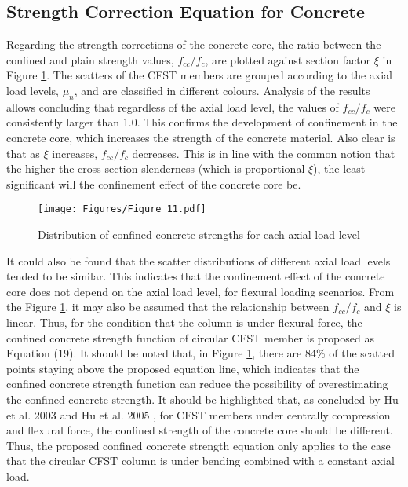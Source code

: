 \documentclass[12pt,a4]{article}
\begin{document}
	\subsection{Strength Correction Equation for Concrete}
	Regarding the strength corrections of the concrete core, the ratio between the confined and plain strength values, $f_{cc}/f_c$, are plotted against section factor $ξ$ in Figure \ref{fig-10}. The scatters of the CFST members are grouped according to the axial load levels, $μ_n$, and are classified in different colours. Analysis of the results allows concluding that regardless of the axial load level, the values of $f_{cc}/f_c$ were consistently larger than 1.0. This confirms the development of confinement in the concrete core, which increases the strength of the concrete material. Also clear is that as $ξ$ increases, $f_{cc}/f_c$ decreases. This is in line with the common notion that the higher the cross-section slenderness (which is proportional $ξ$), the least significant will the confinement effect of the concrete core be.
	\par
	\begin{figure}[h]
		\centering
		\texttt{[image: Figures/Figure\_11.pdf]}
		\caption{Distribution of confined concrete strengths for each axial load level}
		\label{fig-10}
	\end{figure}
	\par
	It could also be found that the scatter distributions of different axial load levels tended to be similar. This indicates that the confinement effect of the concrete core does not depend on the axial load level, for flexural loading scenarios. From the Figure \ref{fig-10}, it may also be assumed that the relationship between $f_{cc}/f_c$ and $ξ$ is linear. Thus, for the condition that the column is under flexural force, the confined concrete strength function of circular CFST member is proposed as Equation (19). It should be noted that, in Figure \ref{fig-10}, there are 84\% of the scatted points staying above the proposed equation line, which indicates that the confined concrete strength function can reduce the possibility of overestimating the confined concrete strength. It should be highlighted that, as concluded by Hu et al. 2003 \cite{RN1} and Hu et al. 2005 \cite{RN29}, for CFST members under centrally compression and flexural force, the confined strength of the concrete core should be different. Thus, the proposed confined concrete strength equation only applies to the case that the circular CFST column is under bending combined with a constant axial load.
\end{document}
